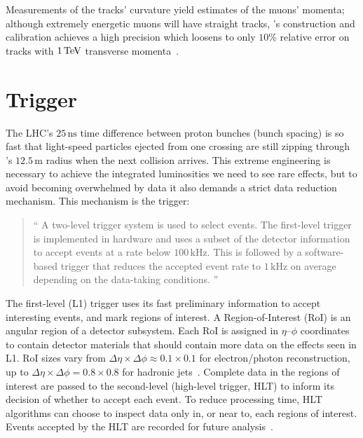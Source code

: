 Measurements of the tracks' curvature yield estimates of the muons' momenta;
although extremely energetic muons will have straight tracks,
\atlas's construction and calibration achieves a high precision which
loosens to only $10\%$ relative error on tracks with $1\,\eV[T]$ transverse
momenta~\cite{
atlas1994proposal,
atlas2008experiment,
ATL-PHYS-PUB-2015-037
}.


\section{Trigger}
\label{sec:atlas_trigger}
The LHC's $25\,\mathrm{ns}$ time difference between proton bunches
(bunch spacing) is so fast that light-speed particles ejected from one crossing
are still zipping through \atlas's $12.5\,\textrm{m}$ radius when the next
collision arrives.
This extreme engineering is necessary to achieve the integrated luminosities we
need to see rare effects, but to avoid becoming overwhelmed
by data it also demands a strict data reduction mechanism.
This mechanism is the trigger:
\begin{quote}
``%
A two-level trigger system is used to select events.
The first-level trigger is implemented in hardware and uses a subset of the
detector information to accept events at a rate below $100\,\mathrm{kHz}$.
This is followed by a software-based trigger that reduces the accepted event
rate to $1\,\mathrm{kHz}$ on average depending on the data-taking conditions.%
''~\cite{atlas2022searches}
\end{quote}
The first-level (L1) trigger uses its fast preliminary information to accept
interesting events, and mark regions of interest.
A Region-of-Interest (RoI) is an angular region of a detector subsystem.
Each RoI is assigned in $\eta\textrm{--}\phi$ coordinates to contain detector materials
that should contain more data on the effects seen in L1.
RoI sizes vary from
$\Delta\eta \times \Delta\phi \approx 0.1 \times 0.1$ for electron/photon
reconstruction, up to
$\Delta\eta \times \Delta\phi = 0.8 \times 0.8$ for
hadronic jets~\cite{atlas2016trigger}.
Complete data in the regions of interest are passed to the second-level
(high-level trigger, HLT) to inform its decision of whether to accept each
event.
To reduce processing time, HLT algorithms can choose to inspect data only in,
or near to, each regions of interest.
Events accepted by the HLT are recorded for future analysis~\cite{
atlas2016trigger,
atlas2008experiment
}.

